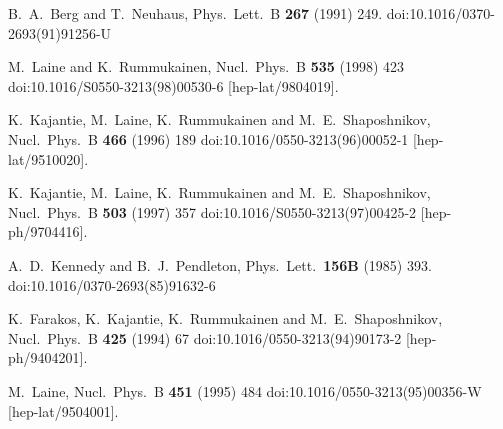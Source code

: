 \documentclass[11pt,a4paper]{article}
\begin{document}
\begin{thebibliography}{*}


  B.~A.~Berg and T.~Neuhaus,
  Phys.\ Lett.\ B {\bf 267} (1991) 249.
  doi:10.1016/0370-2693(91)91256-U

M.~Laine and K.~Rummukainen,
Nucl.\ Phys.\ B {\bf 535} (1998) 423
doi:10.1016/S0550-3213(98)00530-6
[hep-lat/9804019].


  K.~Kajantie, M.~Laine, K.~Rummukainen and M.~E.~Shaposhnikov,
  Nucl.\ Phys.\ B {\bf 466} (1996) 189
  doi:10.1016/0550-3213(96)00052-1
  [hep-lat/9510020].
  
  K.~Kajantie, M.~Laine, K.~Rummukainen and M.~E.~Shaposhnikov,
  Nucl.\ Phys.\ B {\bf 503} (1997) 357
  doi:10.1016/S0550-3213(97)00425-2
  [hep-ph/9704416].


  A.~D.~Kennedy and B.~J.~Pendleton,
  Phys.\ Lett.\  {\bf 156B} (1985) 393.
  doi:10.1016/0370-2693(85)91632-6

  K.~Farakos, K.~Kajantie, K.~Rummukainen and M.~E.~Shaposhnikov,
  Nucl.\ Phys.\ B {\bf 425} (1994) 67
  doi:10.1016/0550-3213(94)90173-2
  [hep-ph/9404201].


  M.~Laine,
  Nucl.\ Phys.\ B {\bf 451} (1995) 484
  doi:10.1016/0550-3213(95)00356-W
  [hep-lat/9504001].


\end{thebibliography}
\end{document}
